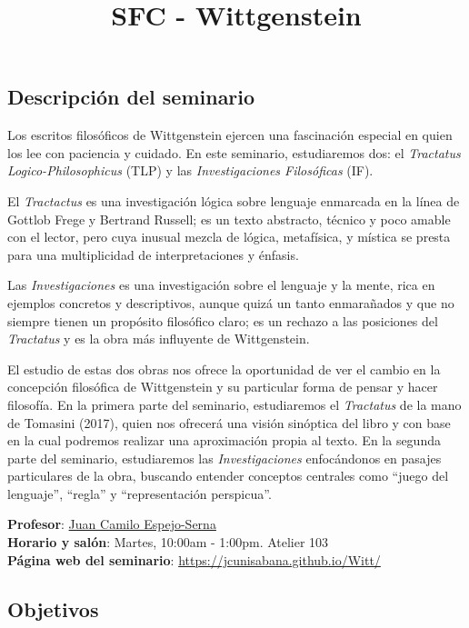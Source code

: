 \documentclass[spanish,]{article}
\title{SFC - Wittgenstein}
\author{}
\date{}
\begin{document}
\maketitle

\subsection{Descripción del seminario}\label{descripcion-del-seminario}

Los escritos filosóficos de Wittgenstein ejercen una fascinación
especial en quien los lee con paciencia y cuidado. En este seminario,
estudiaremos dos: el \emph{Tractatus Logico-Philosophicus} (TLP) y las
\emph{Investigaciones Filosóficas} (IF).

El \emph{Tractactus} es una investigación lógica sobre lenguaje
enmarcada en la línea de Gottlob Frege y Bertrand Russell; es un texto
abstracto, técnico y poco amable con el lector, pero cuya inusual mezcla
de lógica, metafísica, y mística se presta para una multiplicidad de
interpretaciones y énfasis.

Las \emph{Investigaciones } es una investigación sobre el lenguaje y la
mente, rica en ejemplos concretos y descriptivos, aunque quizá un tanto
enmarañados y que no siempre tienen un propósito filosófico claro; es un
rechazo a las posiciones del \emph{Tractatus} y es la obra más
influyente de Wittgenstein.

El estudio de estas dos obras nos ofrece la oportunidad de ver el cambio
en la concepción filosófica de Wittgenstein y su particular forma de
pensar y hacer filosofía. En la primera parte del seminario,
estudiaremos el \emph{Tractatus} de la mano de Tomasini (2017), quien
nos ofrecerá una visión sinóptica del libro y con base en la cual
podremos realizar una aproximación propia al texto. En la segunda parte
del seminario, estudiaremos las \emph{Investigaciones} enfocándonos en
pasajes particulares de la obra, buscando entender conceptos centrales
como ``juego del lenguaje'', ``regla'' y ``representación perspicua''.

\textbf{Profesor}: \href{../index.html}{Juan Camilo Espejo-Serna}\\
\textbf{Horario y salón}: Martes, 10:00am - 1:00pm. Atelier 103\\
\textbf{Página web del seminario}:
\url{https://jcunisabana.github.io/Witt/}

\subsection{Objetivos}\label{objetivos}
\end{document}
